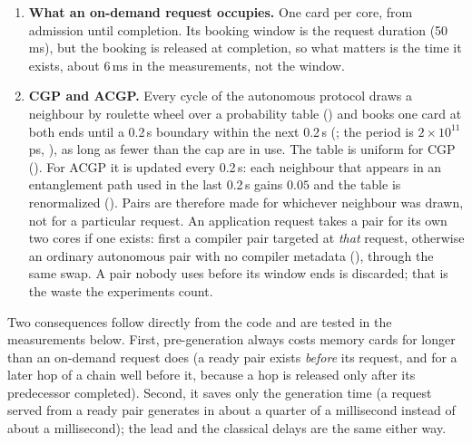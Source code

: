 \begin{enumerate}
    is not free (); the prepared pair's own booking overlaps. When the request's reservation runs, the generation protocol
    looks for a ready pair for the same two cores, and if it finds one it \emph{swaps} the pair's state into the request's own memory after a classical delay
    () and only then releases the prepared pair's memory (). So for a short time a hit holds \emph{two} cards
    at each core. This is a property of ACE's design, not of the compiler policy, and it is why requests served from a ready pair can still wait for admission.
  \item \textbf{What an on-demand request occupies.} One card per core, from admission until completion. Its booking window is the request duration (50\,ms), but the booking is
    released at completion, so what matters is the time it exists, about 6\,ms in the measurements, not the window.
  \item \textbf{CGP and ACGP.} Every cycle of the autonomous protocol draws a neighbour by roulette wheel over a probability table () and books one card at both
    ends until a 0.2\,s boundary within the next 0.2\,s (; the period is $2\times10^{11}$\,ps, ), as long as fewer than the cap are in use.
    The table is uniform for CGP (). For ACGP it is updated every 0.2\,s: each neighbour that appears in an entanglement path used in the last 0.2\,s gains $0.05$
    and the table is renormalized (). Pairs are therefore made for whichever neighbour was drawn, not for a particular request.
    An application request takes a pair for its own two cores if one exists: first a compiler pair targeted at \emph{that} request, otherwise an ordinary autonomous pair with no
    compiler metadata (), through the same swap. A pair nobody uses before its window ends is discarded; that is the waste the experiments count.
\end{enumerate}
Two consequences follow directly from the code and are tested in the measurements below. First, pre-generation always costs memory cards for longer than an on-demand request does
(a ready pair exists \emph{before} its request, and for a later hop of a chain well before it, because a hop is released only after its predecessor completed). Second, it
saves only the generation time (a request served from a ready pair generates in about a quarter of a millisecond instead of about a millisecond); the lead and the classical delays are the same either way.
